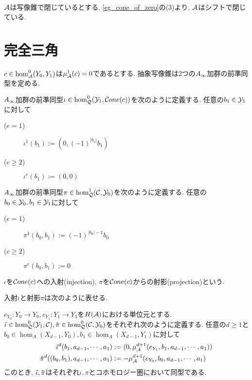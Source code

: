 \documentclass[uplatex, a4paper, 14Q, dvipdfmx]{jsarticle}
\begin{document}

\begin{remark} \label{rem_cone_closedd_induces_shift_sum_closed}
  $\mathcal{A}$は写像錐で閉じているとする. 
  \cref{eg_cone_of_zero}の(3)より, $\mathcal{A}$はシフトで閉じている.  
\end{remark}

\section{完全三角}

$c \in \hom^0_{\mathcal{A}}(Y_0,Y_1)$は$\mu^1_{\mathcal{A}}(c)= 0$であるとする. 
抽象写像錐は2つの$A_{\infty}$加群の前準同型を定める.

\begin{definition}[入射と射影]
  $A_{\infty}$加群の前準同型$\iota \in \hom^0_{\mathcal{Q}}(\mathcal{Y}_1,\mathcal{C} one(c))$を次のように定義する.
  任意の$b_1 \in \mathcal{Y}_1$に対して
  \begin{description}
    \item[($e=1$)] $\iota^1(b_1) := (0,(-1)^{|b_1|} b_1)$
    \item[($e \geq 2$)] $\iota^e(b_1) := (0,0)$
  \end{description}
  $A_{\infty}$加群の前準同型$\pi \in \hom^1_{\mathcal{Q}}(\mathcal{C},\mathcal{Y}_0)$を次のように定義する.
  任意の$b_0 \in \mathcal{Y}_0, b_1 \in \mathcal{Y}_1$に対して
  \begin{description}
    \item[($e=1$)] $\pi^1(b_0,b_1) := (-1)^{|b_0|-1} b_0$
    \item[($e \geq 2$)] $\pi^e(b_0,b_1) := 0$
  \end{description}
  $\iota$を$\mathcal{C} one(c)$への入射(injection), $\pi$を$\mathcal{C} one(c)$からの射影(projection)という. 
\end{definition}

入射$\iota$と射影$\pi$は次のように表せる.

\begin{lemma}
  $e_{Y_0}: Y_0 \to Y_0, e_{Y_1} : Y_1 \to Y_1$を$H(\mathcal{A})$における単位元とする. 
  $\tilde{\iota} \in \hom^0_{\mathcal{Q}}(\mathcal{Y}_1,\mathcal{C}), \tilde{\pi} \in \hom^0_{\mathcal{Q}}(\mathcal{C},\mathcal{Y}_0)$をそれぞれ次のように定義する. 
  任意の$d \geq 1$と$b_0 \in \hom_A(X_{d-1},Y_0), b_1 \in \hom_A(X_{d-1},Y_1)$に対して
  \begin{align*}
    \tilde{\iota}^d(b_1,a_{d-1},\cdots,a_1) &:= (0,\mu^{d+1}_{\mathcal{A}}(e_{Y_1},b_1,a_{d-1},\cdots,a_1)) \\
    \tilde{\pi}^d((b_0,b_1),a_{d-1},\cdots,a_1) &:= -\mu^{d+1}_{\mathcal{A}}(e_{Y_0},b_0,a_{d-1},\cdots,a_1)
  \end{align*}
  このとき, $\tilde{\iota}, \tilde{\pi}$はそれぞれ$\iota, \pi$とコホモロジー圏において同型である. 
\end{lemma}
\end{document}
